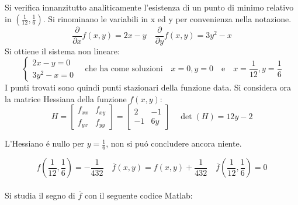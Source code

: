 \begin{center}
\footnotesize\noindent{}\end{center}

\noindent Si verifica innanzitutto analiticamente l'esistenza di un punto di minimo relativo in \((\frac{1}{12}, \frac{1}{6})\). Si rinominano le variabili in x ed y per convenienza nella notazione.
\[
\frac{\partial}{\partial x}f(x,y) = 2x -y \quad \frac{\partial}{\partial y}f(x,y) = 3y^2 - x
\]
\noindent Si ottiene il sistema non lineare:
\[
\begin{cases}
2x -y = 0 \\
3y^2 - x = 0
\end{cases}
\quad \text{che ha come soluzioni} \quad x=0, y=0 \quad \text{e} \quad x=\frac{1}{12}, y=\frac{1}{6}
\]
\noindent I punti trovati sono quindi punti stazionari della funzione data. Si considera ora la matrice Hessiana della funzione \(f(x,y)\):
\[
H =
\begin{bmatrix} f_{xx} & f_{xy} \\ f_{yx} & f_{yy} \end{bmatrix}
=
\begin{bmatrix} 2 & -1 \\ -1 & 6y \end{bmatrix}
\quad
\det(H) = 12y -2
\]

\noindent L'Hessiano \'e nullo per \(y=\frac{1}{6}\), non si pu\'o concludere ancora niente.

\[
f(\frac{1}{12}, \frac{1}{6}) = -\frac{1}{432} \quad \overline{f}(x,y) = f(x,y) + \frac{1}{432} \quad \overline{f}(\frac{1}{12}, \frac{1}{6}) = 0
\]
\\

\noindent Si studia il segno di \(\overline{f} \) con il seguente codice Matlab:
\\


